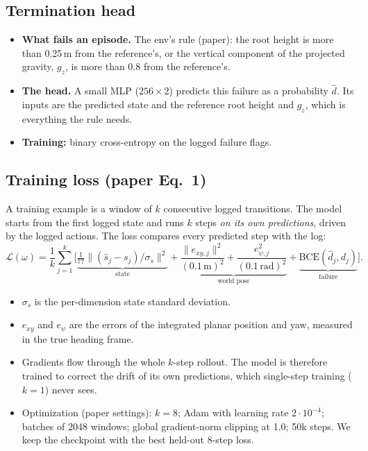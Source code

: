 \documentclass[10pt]{article}
\begin{document}
\subsection{Termination head}

\begin{itemize}
  \item \textbf{What fails an episode.} The env's rule (paper): the root height is more than 0.25\,m
  from the reference's, or the vertical component of the projected gravity, $g_z$, is more than 0.8
  from the reference's.
  \item \textbf{The head.} A small MLP ($256{\times}2$) predicts this failure as a probability
  $\hat d$. Its inputs are the predicted state and the reference root height and $g_z$, which is
  everything the rule needs.
  \item \textbf{Training:} binary cross-entropy on the logged failure flags.
\end{itemize}

\subsection{Training loss (paper Eq.~1)}

A training example is a window of $k$ consecutive logged transitions. The model starts from the first
logged state and runs $k$ steps \emph{on its own predictions}, driven by the logged actions. The loss
compares every predicted step with the log:
\[
\mathcal L(\omega) = \frac1k \sum_{j=1}^{k}\Big[
\underbrace{\tfrac{1}{77}\big\|(\hat s_j - s_j)/\sigma_s\big\|^2}_{\text{state}}
+ \underbrace{\frac{\|e_{xy,j}\|^2}{(0.1\,\mathrm m)^2} + \frac{e_{\psi,j}^2}{(0.1\,\mathrm{rad})^2}}_{\text{world pose}}
+ \underbrace{\mathrm{BCE}(\hat d_j, d_j)}_{\text{failure}} \Big].
\]
\begin{itemize}
  \item $\sigma_s$ is the per-dimension state standard deviation.
  \item $e_{xy}$ and $e_\psi$ are the errors of the integrated planar position and yaw, measured in the
  true heading frame.
  \item Gradients flow through the whole $k$-step rollout. The model is therefore trained to correct
  the drift of its own predictions, which single-step training ($k=1$) never sees.
  \item Optimization (paper settings): $k = 8$; Adam with learning rate $2\cdot10^{-4}$; batches of
  2048 windows; global gradient-norm clipping at 1.0; 50k steps. We keep the checkpoint with the best
  held-out 8-step loss.
\end{itemize}
\end{document}
